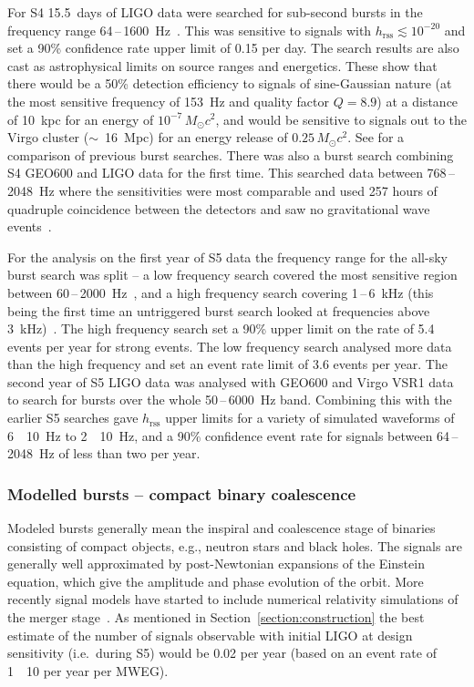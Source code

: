 \documentclass{article}
\newcommand{\Hz}{Hz\super{-1/2}\xspace}
\begin{document}
For S4 15.5~days of LIGO data were searched for sub-second bursts in the
frequency range 64\,--\,1600~Hz~\cite{Abbott:2007b}. This was sensitive to signals
with $h_{\mathrm{rss}}\lesssim10^{-20}$ and set a 90\% confidence rate upper limit of
0.15 per day. The search results are also cast as astrophysical limits on source
ranges and energetics. These show that there would be a 50\% detection
efficiency to signals of sine-Gaussian nature (at the most sensitive frequency
of 153~Hz and quality factor $Q=8.9$) at a distance of 10~kpc for an energy of
$10^{-7}\,M_{\odot}c^2$, and would be sensitive to signals out to the Virgo
cluster ($\sim$~16~Mpc) for an energy release of $0.25\,M_{\odot}c^2$. See
\cite{Abbott:2007b} for a comparison of previous burst searches. There was also
a burst search combining S4 GEO600 and LIGO data for the first time. This
searched data between 768\,--\,2048~Hz where the sensitivities were most comparable
and used 257 hours of quadruple coincidence between the detectors and saw no
gravitational wave events~\cite{Abbott:2008b}.

For the analysis on the first year of S5 data the frequency range for the
all-sky burst search was split -- a low frequency search covered the most
sensitive region between 60\,--\,2000~Hz~\cite{Abbott:2009h}, and a high frequency
search covering 1\,--\,6~kHz (this being the first time an untriggered burst search
looked at frequencies above 3~kHz)~\cite{Abbott:2009i}. The high frequency
search set a 90\% upper limit on the rate of 5.4 events per year for strong
events. The low frequency search analysed more data than the high frequency and
set an event rate limit of 3.6 events per year. The second year of S5 LIGO data
was analysed with GEO600 and Virgo VSR1 data~\cite{Abadie:2010d} to search for
bursts over the whole 50\,--\,6000~Hz band. Combining this with the earlier S5
searches gave $h_{\mathrm{rss}}$ upper limits for a variety of
simulated waveforms of 6~\texttimes~10~\Hz to
2~\texttimes~10~\Hz, and a 90\% confidence event rate for
signals between 64\,--\,2048~Hz of less than two per year.


\subsubsection{Modelled bursts -- compact binary coalescence}
\label{sec:cbc}

Modeled bursts generally mean the inspiral and coalescence stage of binaries
consisting of compact objects, e.g., neutron stars and black holes. The signals
are generally well approximated by post-Newtonian expansions of the Einstein
equation, which give the amplitude and phase evolution of the orbit. More
recently signal models have started to include numerical relativity simulations
of the merger stage~\cite{Aylott:2009}. As mentioned in
Section~\ref{section:construction} the best estimate of the number of signals
observable with initial LIGO at design sensitivity (i.e.\ during S5) would be
0.02 per year (based on an event rate of 1~\texttimes~10 per year per MWEG).
\end{document}
